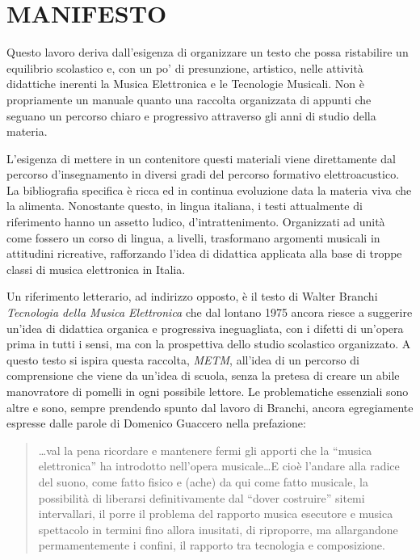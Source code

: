 
\chapter*{MANIFESTO}


Questo lavoro deriva dall'esigenza di organizzare un testo che possa
ristabilire un equilibrio scolastico e, con un po' di presunzione, artistico,
nelle attività didattiche inerenti la Musica Elettronica e le Tecnologie
Musicali. Non è propriamente un manuale quanto una raccolta organizzata di
appunti che seguano un percorso chiaro e progressivo attraverso gli anni di
studio della materia.

L'esigenza di mettere in un contenitore questi materiali viene direttamente
dal percorso d'insegnamento in diversi gradi del percorso formativo elettroacustico.
La bibliografia specifica è ricca ed in continua evoluzione data la materia
viva che la alimenta. Nonostante questo, in lingua italiana, i testi attualmente di
riferimento hanno un assetto ludico, d'intrattenimento. Organizzati ad
unità come fossero un corso di lingua, a livelli, trasformano argomenti musicali
in attitudini ricreative, rafforzando l'idea di didattica applicata alla base
di troppe classi di musica elettronica in Italia.

Un riferimento letterario, ad indirizzo opposto, è il testo di Walter Branchi
\emph{Tecnologia della Musica Elettronica} che dal lontano 1975 ancora riesce
a suggerire un'idea di didattica organica e progressiva ineguagliata, con i
difetti di un'opera prima in tutti i sensi, ma con la prospettiva dello studio
scolastico organizzato. A questo testo si ispira questa raccolta, \emph{METM},
all'idea di un percorso di comprensione che viene da un'idea di scuola,
senza la pretesa di creare un abile manovratore di pomelli in ogni possibile lettore.
Le problematiche essenziali sono altre e sono, sempre prendendo spunto dal lavoro di Branchi,
ancora egregiamente espresse dalle parole di Domenico Guaccero nella prefazione:

\begin{quote}
  \ldots val la pena ricordare e mantenere fermi gli apporti che la “musica
  elettronica” ha introdotto nell'opera musicale\ldots E cioè l'andare alla
  radice del suono, come fatto fisico e (ache) da qui come fatto musicale, la
  possibilità di liberarsi definitivamente dal “dover costruire” sitemi
  intervallari, il porre il problema del rapporto musica esecutore e musica
  spettacolo in termini fino allora inusitati, di riproporre, ma allargandone
  permamentemente i confini, il rapporto tra tecnologia e composizione.
\end{quote}

